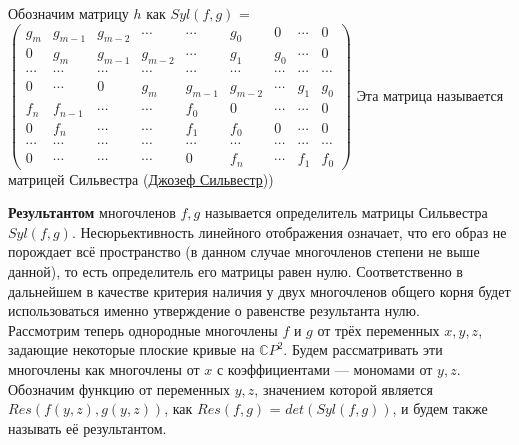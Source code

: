 \documentclass[a4paper, 12pt]{article}
\begin{document}
Обозначим матрицу $h$ как $Syl(f,g)$ =\\

$\begin{pmatrix}
g_m & g_{m-1} & g_{m-2} & \cdots & \cdots & g_0 & 0 & \cdots & 0 \\
0 & g_m & g_{m-1} & g_{m-2} & \cdots & g_1 & g_0 & \cdots & 0 \\
\cdots & \cdots & \cdots & \cdots & \cdots & \cdots & \cdots & \cdots & \cdots \\
0 & \cdots & 0 & g_m & g_{m-1} & g_{m-2} & \cdots & g_1 & g_0 \\
f_n & f_{n-1} & \cdots & \cdots & f_0 & 0 & \cdots & \cdots & 0 \\
0 & f_n & \cdots & \cdots & f_1 & f_0 & 0 & \cdots & 0 \\
\cdots & \cdots & \cdots & \cdots & \cdots & \cdots & \cdots & \cdots & \cdots \\
0 & \cdots & \cdots & \cdots & 0 & f_n & \cdots & f_1 & f_0
\end{pmatrix}$
\newline
Эта матрица называется матрицей Сильвестра (\href{https://ru.wikipedia.org/wiki/%D0%A1%D0%B8%D0%BB%D1%8C%D0%B2%D0%B5%D1%81%D1%82%D1%80,_%D0%94%D0%B6%D0%B5%D0%B9%D0%BC%D1%81_%D0%94%D0%B6%D0%BE%D0%B7%D0%B5%D1%84}{Джозеф Сильвестр}))

\textbf{Результантом} многочленов $f,g$ называется определитель матрицы Сильвестра $Syl(f,g)$.\newline
\newline
Несюрьективность линейного отображения означает, что его образ не порождает всё пространство (в данном случае многочленов степени не выше данной), то есть определитель его матрицы равен нулю. Соответственно в дальнейшем в качестве критерия наличия у двух многочленов общего корня будет использоваться именно утверждение о равенстве результанта нулю.\\

Рассмотрим теперь однородные многочлены $f$ и $g$ от трёх переменных $x,y,z$, задающие некоторые плоские кривые на $\mathbb{C}P^2$.\newline
Будем рассматривать эти многочлены как многочлены от $x$ с коэффициентами --- мономами от $y,z$.\newline
Обозначим функцию от переменных $y,z$, значением которой является\newline $Res(f(y,z),g(y,z))$, как $Res(f,g)$ = $det(Syl(f,g))$, и будем также называть её результантом.\\
\end{document}
